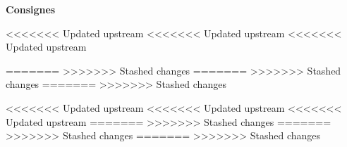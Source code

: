 

\noindent\textbf{Consignes}

<<<<<<< Updated upstream
<<<<<<< Updated upstream
<<<<<<< Updated upstream



=======
>>>>>>> Stashed changes
=======
>>>>>>> Stashed changes
=======
>>>>>>> Stashed changes



<<<<<<< Updated upstream
<<<<<<< Updated upstream
<<<<<<< Updated upstream
=======
>>>>>>> Stashed changes
=======
>>>>>>> Stashed changes
=======
>>>>>>> Stashed changes






